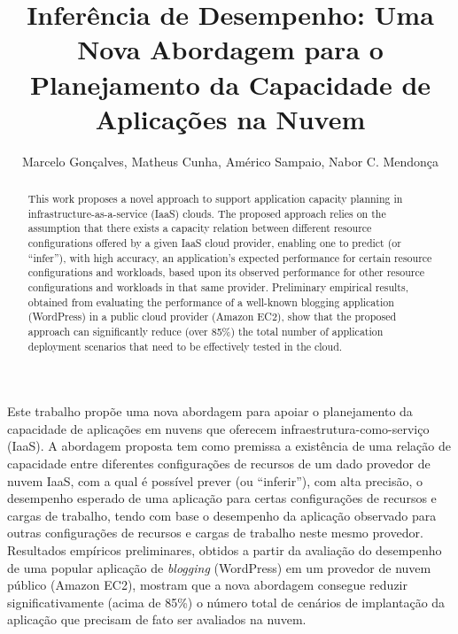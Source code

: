 \documentclass[12pt]{article}
\title{Inferência de Desempenho: Uma Nova Abordagem para o Planejamento da Capacidade de Aplicações na Nuvem}
\author{Marcelo Gonçalves, Matheus Cunha, Américo Sampaio, Nabor C. Mendonça}
\begin{document}
 

\maketitle

\begin{resumo} 


Este trabalho propõe uma nova abordagem para apoiar o planejamento da capacidade de aplicações em nuvens que oferecem infraestrutura-como-serviço (IaaS). A abordagem proposta tem como premissa a existência de uma relação de capacidade entre diferentes configurações de recursos de um dado provedor de nuvem IaaS, com a qual é possível prever (ou ``inferir''), com alta precisão, o desempenho esperado de uma aplicação para certas configurações de recursos e cargas de trabalho, tendo com base o desempenho da aplicação observado para outras configurações de recursos e cargas de trabalho neste mesmo provedor. Resultados empíricos preliminares, obtidos a partir da avaliação do desempenho de uma popular aplicação de \emph{blogging} (WordPress) em um provedor de nuvem público (Amazon EC2), mostram que a nova abordagem consegue reduzir significativamente (acima de 85\%) o número total de cenários de implantação da aplicação que precisam de fato ser avaliados na nuvem.

\end{resumo}

\begin{abstract}


This work proposes a novel approach to support application capacity planning in infrastructure-as-a-service (IaaS) clouds. The proposed approach relies on the assumption that there exists a capacity relation between different resource configurations offered by a given IaaS cloud provider, enabling one to predict (or ``infer''), with high accuracy, an application's expected performance for certain resource configurations and workloads, based upon its observed performance for other resource configurations and workloads in that same provider. Preliminary empirical results, obtained from evaluating the performance of a well-known blogging application (WordPress) in a public cloud provider (Amazon EC2), show that the proposed approach can significantly reduce (over 85\%) the total number of application deployment scenarios that need to be effectively tested in the cloud.

\end{abstract}
\end{document}
